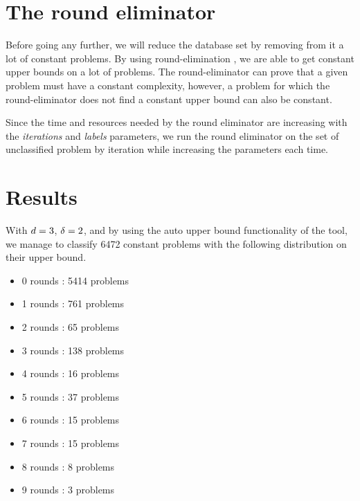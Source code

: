 \section{The round eliminator}
Before going any further, we will reduce the database set by removing from it a lot of constant problems.
By using round-elimination \cite{round-eliminator}, we are able to get constant upper bounds on a lot of problems. The round-eliminator can prove that a given problem must have a constant complexity, however, a problem for which the round-eliminator does not find a constant upper bound can also be constant.

Since the time and resources needed by the round eliminator are increasing with the \textit{iterations} and \textit{labels} parameters, we run the round eliminator on the set of unclassified problem by iteration while increasing the parameters each time.

\section{Results}
With $d = 3$, $\delta = 2$, and by using the auto upper bound functionality of the tool, we manage to classify 6472 constant problems with the following distribution on their upper bound.
\begin{itemize}
    \item 0 rounds : 5414 problems
    \item 1 rounds : 761 problems
    \item 2 rounds : 65 problems
    \item 3 rounds : 138 problems
    \item 4 rounds : 16 problems
    \item 5 rounds : 37 problems
    \item 6 rounds : 15 problems
    \item 7 rounds : 15 problems
    \item 8 rounds : 8 problems
    \item 9 rounds : 3 problems
\end{itemize}